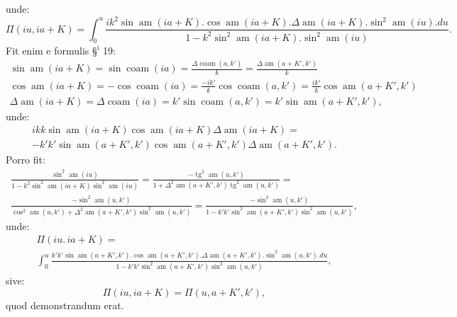 \documentclass{article}
\begin{document}
unde:
\[
\Pi(iu,ia+K)=\int_{0}^{u}\frac{ik^{2}\sin\operatorname{am}(ia+K).\cos\operatorname{am}(ia+K).\Delta\operatorname{am}(ia+K).\sin^{2}\operatorname{am}(iu).du}{1-k^{2}\sin^{2}\operatorname{am}(ia+K).\sin^{2}\operatorname{am}(iu)}.
\]
Fit enim e formulis §$^{\mathrm{i}}$ 19:
\[
\begin{gathered}
\sin\operatorname{am}(ia+K)=\sin\operatorname{coam}(ia)=\frac{\Delta\operatorname{coam}(a,k')}{k}=\frac{\Delta\operatorname{am}(a+K',k')}{k}\\[1.5ex]
\cos\operatorname{am}(ia+K)=-\cos\operatorname{coam}(ia)=\frac{-ik'}{k}\cos\operatorname{coam}(a,k')=\frac{ik'}{k}\cos\operatorname{am}(a+K',k')\\[1.5ex]
\Delta\operatorname{am}(ia+K)=\Delta\operatorname{coam}(ia)=k'\sin\operatorname{coam}(a,k')=k'\sin\operatorname{am}(a+K',k'),
\end{gathered}
\]
unde:
\[
\begin{gathered}
ikk\sin\operatorname{am}(ia+K)\cos\operatorname{am}(ia+K)\Delta\operatorname{am}(ia+K)=\\
-k'k'\sin\operatorname{am}(a+K',k')\cos\operatorname{am}(a+K',k')\Delta\operatorname{am}(a+K',k').
\end{gathered}
\]
Porro fit:
\[
\begin{gathered}
\frac{\sin^{2}\operatorname{am}(iu)}{1-k^{2}\sin^{2}\operatorname{am}(ia+K)\sin^{2}\operatorname{am}(iu)}=\frac{-\operatorname{tg}^{2}\operatorname{am}(u,k')}{1+\Delta^{2}\operatorname{am}(a+K',k')\operatorname{tg}^{2}\operatorname{am}(u,k')}=\\[1.5ex]
\frac{-\sin^{2}\operatorname{am}(u,k')}{\cos^{2}\operatorname{am}(u,k')+\Delta^{2}\operatorname{am}(a+K',k')\sin^{2}\operatorname{am}(u,k')}=\frac{-\sin^{2}\operatorname{am}(u,k')}{1-k'k'\sin^{2}\operatorname{am}(a+K',k')\sin^{2}\operatorname{am}(u,k')},
\end{gathered}
\]
unde:
\[
\begin{gathered}
\Pi(iu.\,ia+K)=\\[1.5ex]
\int_{0}^{u}\frac{k'k'\sin\operatorname{am}(a+K',k').\cos\operatorname{am}(a+K',k').\Delta\operatorname{am}(a+K',k').\sin^{2}\operatorname{am}(u,k').du}{1-k'k'\sin^{2}\operatorname{am}(a+K',k')\sin^{2}\operatorname{am}(u,k')},
\end{gathered}
\]
sive:
\[
\Pi(iu,ia+K)=\Pi(u,a+K',k'),
\]
quod demonstrandum erat.
\end{document}
